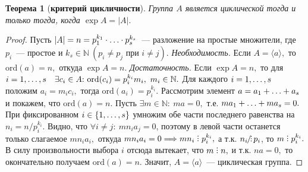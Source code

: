 \documentclass[a4paper, 14pt]{extarticle}
\newcommand{\naturals}{\mathbb{N}}
\newcommand{\ord}{\mathrm{ord}}
\newcommand{\suchthat}{{:}{ } \ }
\DeclareRobustCommand{\divby}{%
	\mathrel{\text{\vbox{\baselineskip.65ex\lineskiplimit0pt\hbox{.}\hbox{.}\hbox{.}}}}%
}
\DeclareRobustCommand{\ndivby}{%
	\mathrel{\text{%
			\vbox{\baselineskip.65ex\lineskiplimit0pt\hbox{.}\hbox{.}\hbox{.}}%
			\kern-1.5ex\hbox{/}%
	}}%
}
\theoremstyle{definition}
\theoremstyle{plain}
\newtheorem*{theorem*}{Теорема}
\numberwithin{theorem}{section}
\numberwithin{definition}{section}
\numberwithin{statement}{section}
\numberwithin{lemma}{section}
\numberwithin{consequence}{section}
\begin{document}
        \newpage
	\begin{theorem*}[\textbf{критерий цикличности}]
		Группа $A$ является циклической тогда и только тогда, когда ${\exp A = |A|.}$
	\end{theorem*}
	\begin{proof}
		Пусть ${|A| = n = p^{k_1}_1 \cdot \mathellipsis \cdot p^{k_s}_s}$~--- разложение на простые множители, где $p_i$~--- простое и ${k_s \in \naturals \ (p_i \neq p_j \text{ при } i \neq j).}$ \newline
		{\textit{Необходимость.}} Если ${A = \langle a \rangle,}$ то ${\ord (a) = n,}$ откуда ${\exp A = n.}$ \newline
		{\textit{Достаточность.}} Если ${\exp A = n,}$ то для ${i = 1, \mathellipsis, s \quad \exists c_i \in A \suchthat \ord(c_i) = p^{k_i}_i m_i, \ m_i \in \naturals.}$ Для каждого ${i = 1, \mathellipsis, s}$ положим ${a_i = m_i c_i,}$ тогда ${\ord(a_i) = p^{k_i}_i.}$ Рассмотрим элемент ${a = a_1 + \mathellipsis + a_s}$ и покажем, что ${\ord(a) = n.}$ Пусть ${\exists m \in \naturals \suchthat ma = 0,}$ т.е. ${ma_1 + \mathellipsis + ma_s = 0.}$ При фиксированном ${i \in \{1, \mathellipsis, s\}}$ умножим обе части последнего равенства на ${n_i = n/p^{k_i}_i.}$ Видно, что ${\forall i \neq j{:} \ mn_ia_j = 0}$, поэтому в левой части останется только слагаемое ${mn_ia_i,}$ откуда ${mn_ia_i = 0 \Longrightarrow mn_i \divby p^{k_i}_i,}$ а т.к. 
		${n_i \ndivby p_i}$, то ${m \divby p^{k_i}_i.}$  В силу произвольности выбора $i$ отсюда вытекает, что ${m \divby n,}$ и т.к. ${na = 0,}$ то окончательно получаем ${\ord(a) = n.}$ Значит, ${A = \langle a \rangle}$~--- циклическая группа.
	\end{proof}
    
        \newpage
\end{document}
